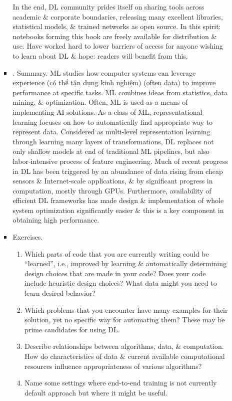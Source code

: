 \documentclass{article}
\begin{document}
\begin{enumerate}
\begin{itemize}
\begin{itemize}
			In the end, DL community prides itself on sharing tools across academic \& corporate boundaries, releasing many excellent libraries, statistical models, \& trained networks as open source. In this spirit: notebooks forming this book are freely available for distribution \& use. Have worked hard to lower barriers of access for anyone wishing to learn about DL \& hope: readers will benefit from this.
			\item {. Summary.} ML studies how computer systems can leverage experience (có thể tận dụng kinh nghiệm) (often data) to improve performance at specific tasks. ML combines ideas from statistics, data mining, \& optimization. Often, ML is used as a means of implementing AI solutions. As a class of ML, representational learning focuses on how to automatically find appropriate way to represent data. Considered as multi-level representation learning through learning many layers of transformations, DL replaces not only shallow models at end of traditional ML pipelines, but also labor-intensive process of feature engineering. Much of recent progress in DL has been triggered by an abundance of data rising from cheap sensors \& Internet-scale applications, \& by significant progress in computation, mostly through GPUs. Furthermore, availability of efficient DL frameworks has made design \& implementation of whole system optimization significantly easier \& this is a key component in obtaining high performance.
			\item {\sf Exercises.}
			\begin{enumerate}
				\item Which parts of code that you are currently writing could be ``learned'', i.e., improved by learning \& automatically determining design choices that are made in your code? Does your code include heuristic design choices? What data might you need to learn desired behavior?
				\item Which problems that you encounter have many examples for their solution, yet no specific way for automating them? These may be prime candidates for using DL.
				\item Describe relationships between algorithms, data, \& computation. How do characteristics of data \& current available computational resources influence appropriateness of various algorithms?
				\item Name some settings where end-to-end training is not currently default approach but where it might be useful.
			\end{enumerate}
		\end{itemize}

\end{itemize}
\end{enumerate}
\end{document}
